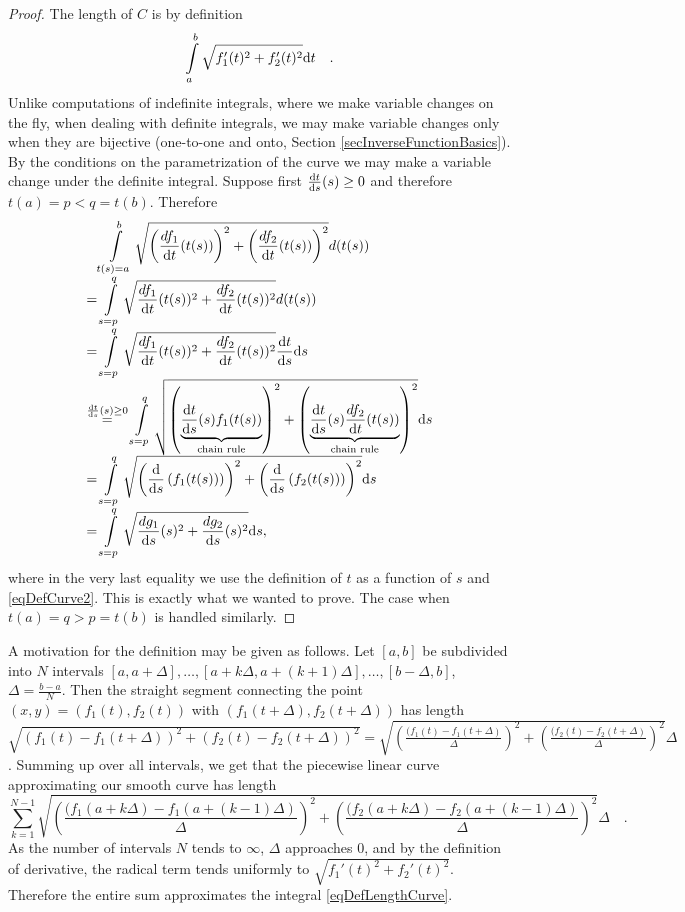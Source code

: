 \documentclass[12pt]{book}
\begin{document}
\begin{proof}
The length of $C$ is by definition
\[
\int\limits_{a}^b \sqrt{f_1'(t)^2+f_2'(t)^2}{\normalfont \text{d}} t \quad .
\]
Unlike computations of indefinite integrals, where we make variable changes on the fly, when dealing with definite integrals, we may make variable changes only when they are bijective (one-to-one and onto, Section \ref{secInverseFunctionBasics}). By the conditions on the parametrization of the curve we may make a variable change under the definite integral. Suppose first $\frac{{\normalfont \text{d}} t}{{\normalfont \text{d}} s}(s)\geq 0$ and therefore $t(a)=p<q=t(b)$. Therefore
\[
\begin{array}{l}
\phantom{=}\displaystyle \int\limits_{t(s)=a}^b \sqrt{\left(\frac{df_1}{{\normalfont \text{d}} t}(t(s))\right)^2+\left(\frac{df_2}{{\normalfont \text{d}} t}(t(s))\right)^2}d(t(s)) \\
\displaystyle =  \int \limits_{s=p}^q \sqrt{\frac{df_1}{{\normalfont \text{d}} t}( t(s))^2+ \frac{df_2}{{\normalfont \text{d}} t}(t(s))^2}d(t(s))\\
= \displaystyle \int\limits_{s=p}^q \sqrt{\frac{df_1}{{\normalfont \text{d}} t}( t(s))^2 + \frac{df_2 }{{\normalfont \text{d}} t}(t(s))^2} \frac{{\normalfont \text{d}} t}{{\normalfont \text{d}} s}{\normalfont \text{d}} s \\
\displaystyle
\stackrel{\frac{{\normalfont \text{d}} t}{{\normalfont \text{d}} s}(s)\geq 0}{=}  \int\limits_{s=p}^q \sqrt{ \left( \underbrace{ \frac{{\normalfont \text{d}} t}{{\normalfont \text{d}} s}(s) f_1( t(s)) }_{ \text{chain rule} } \right)^2+ \left( \underbrace{ \frac{ {\normalfont \text{d}} t}{{\normalfont \text{d}} s}(s) \frac{df_2}{{\normalfont \text{d}} t} (t(s))}_{ \text{chain rule}} \right)^2}{\normalfont \text{d}} s \\
=\displaystyle \int\limits_{s=p}^q \sqrt{ \left(\frac{{\normalfont \text{d}}}{{\normalfont \text{d}} s}\left(f_1(t(s))\right)\right)^2+ \left(\frac{{\normalfont \text{d}}}{{\normalfont \text{d}} s}\left(f_2(t(s))\right)\right)^2}{\normalfont \text{d}} s \\
=\displaystyle \int\limits_{s=p}^q \sqrt{ \frac{ dg_1}{ {\normalfont \text{d}} s}( s)^2 + \frac{dg_2}{{\normalfont \text{d}} s}(s)^2}{\normalfont \text{d}} s,
\quad
\end{array}
\]
where in the very last equality we use the definition of $t$ as a function of $s$ and \eqref{eqDefCurve2}. This is exactly what we wanted to prove. The case when $t(a)=q>p=t(b)$ is handled similarly.
\end{proof}

A motivation for the definition may be given as follows. Let $[a,b]$ be subdivided into $N$ intervals $[a,a+\Delta ], \dots, [a+k\Delta, a+(k+1)\Delta],\dots, [b-\Delta, b]$, $\Delta=\frac{b-a}{N}$. Then the straight segment connecting the point $(x,y)=(f_1(t), f_2(t))$ with $(f_1(t+\Delta), f_2(t+\Delta))$ has length $\sqrt{(f_1(t)-f_1(t+\Delta))^2 + (f_2(t)-f_2(t+\Delta))^2}= \sqrt{\left(\frac{(f_1(t)-f_1(t+\Delta)}{\Delta}\right)^2 + \left(\frac{(f_2(t)- f_2(t+\Delta)}{\Delta} \right)^2}\Delta$. Summing up over all intervals, we get that the piecewise linear curve approximating our smooth curve has length
\[
\sum_{k=1}^{N-1} \sqrt{\left(\frac{(f_1(a+k\Delta)-f_1(a+(k-1)\Delta)}{\Delta}\right)^2 + \left(\frac{(f_2(a+k\Delta)- f_2(a+(k-1)\Delta)}{\Delta} \right)^2}\Delta\quad .
\]
As the number of intervals $N$ tends to $\infty$, $\Delta$ approaches 0, and by the definition of derivative, the radical term tends uniformly to $\sqrt{f_1'(t)^2+f_2'(t)^2}$. Therefore the entire sum approximates the integral \eqref{eqDefLengthCurve}.
\end{document}
